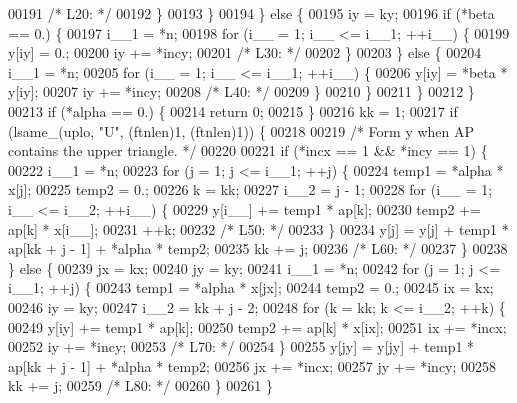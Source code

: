 \begin{DoxyCode}
00191 \textcolor{comment}{/* L20: */}
00192         \}
00193         \}
00194     \} \textcolor{keywordflow}{else} \{
00195         iy = ky;
00196         \textcolor{keywordflow}{if} (*beta == 0.) \{
00197         i\_\_1 = *n;
00198         \textcolor{keywordflow}{for} (i\_\_ = 1; i\_\_ <= i\_\_1; ++i\_\_) \{
00199             y[iy] = 0.;
00200             iy += *incy;
00201 \textcolor{comment}{/* L30: */}
00202         \}
00203         \} \textcolor{keywordflow}{else} \{
00204         i\_\_1 = *n;
00205         \textcolor{keywordflow}{for} (i\_\_ = 1; i\_\_ <= i\_\_1; ++i\_\_) \{
00206             y[iy] = *beta * y[iy];
00207             iy += *incy;
00208 \textcolor{comment}{/* L40: */}
00209         \}
00210         \}
00211     \}
00212     \}
00213     \textcolor{keywordflow}{if} (*alpha == 0.) \{
00214     \textcolor{keywordflow}{return} 0;
00215     \}
00216     kk = 1;
00217     \textcolor{keywordflow}{if} (lsame\_(uplo, \textcolor{stringliteral}{"U"}, (ftnlen)1, (ftnlen)1)) \{
00218 
00219 \textcolor{comment}{/*        Form  y  when AP contains the upper triangle. */}
00220 
00221     \textcolor{keywordflow}{if} (*incx == 1 && *incy == 1) \{
00222         i\_\_1 = *n;
00223         \textcolor{keywordflow}{for} (j = 1; j <= i\_\_1; ++j) \{
00224         temp1 = *alpha * x[j];
00225         temp2 = 0.;
00226         k = kk;
00227         i\_\_2 = j - 1;
00228         \textcolor{keywordflow}{for} (i\_\_ = 1; i\_\_ <= i\_\_2; ++i\_\_) \{
00229             y[i\_\_] += temp1 * ap[k];
00230             temp2 += ap[k] * x[i\_\_];
00231             ++k;
00232 \textcolor{comment}{/* L50: */}
00233         \}
00234         y[j] = y[j] + temp1 * ap[kk + j - 1] + *alpha * temp2;
00235         kk += j;
00236 \textcolor{comment}{/* L60: */}
00237         \}
00238     \} \textcolor{keywordflow}{else} \{
00239         jx = kx;
00240         jy = ky;
00241         i\_\_1 = *n;
00242         \textcolor{keywordflow}{for} (j = 1; j <= i\_\_1; ++j) \{
00243         temp1 = *alpha * x[jx];
00244         temp2 = 0.;
00245         ix = kx;
00246         iy = ky;
00247         i\_\_2 = kk + j - 2;
00248         \textcolor{keywordflow}{for} (k = kk; k <= i\_\_2; ++k) \{
00249             y[iy] += temp1 * ap[k];
00250             temp2 += ap[k] * x[ix];
00251             ix += *incx;
00252             iy += *incy;
00253 \textcolor{comment}{/* L70: */}
00254         \}
00255         y[jy] = y[jy] + temp1 * ap[kk + j - 1] + *alpha * temp2;
00256         jx += *incx;
00257         jy += *incy;
00258         kk += j;
00259 \textcolor{comment}{/* L80: */}
00260         \}
00261     \}

\end{DoxyCode}
